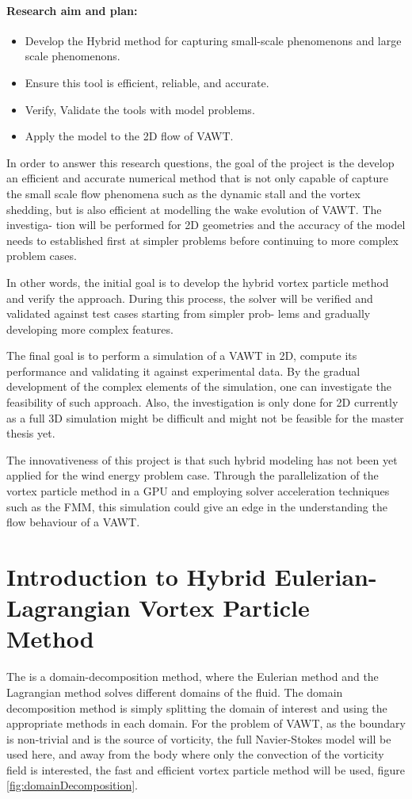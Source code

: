 \paragraph*{Research aim and plan:}
\begin{itemize}
\item Develop the Hybrid method for capturing small-scale phenomenons and large scale phenomenons.
\item Ensure this tool is efficient, reliable, and accurate.
\item Verify, Validate the tools with model problems.
\item Apply the model to the 2D flow of VAWT.
\end{itemize}

In order to answer this research questions, the goal of the project is the develop an efficient and accurate
numerical method that is not only capable of capture the small scale flow phenomena such as the dynamic
stall and the vortex shedding, but is also efficient at modelling the wake evolution of VAWT. The investiga-
tion will be performed for 2D geometries and the accuracy of the model needs to established first at simpler
problems before continuing to more complex problem cases.

In other words, the initial goal is to develop the hybrid vortex particle method and verify the approach.
During this process, the solver will be verified and validated against test cases starting from simpler prob-
lems and gradually developing more complex features.

The final goal is to perform a simulation of a VAWT in 2D, compute its performance and validating it
against experimental data. By the gradual development of the complex elements of the simulation, one can
investigate the feasibility of such approach. Also, the investigation is only done for 2D currently as a full 3D
simulation might be difficult and might not be feasible for the master thesis yet.

The innovativeness of this project is that such hybrid modeling has not been yet applied for the wind energy
problem case. Through the parallelization of the vortex particle method in a GPU and employing solver acceleration techniques such as the FMM, this simulation could give an edge in the understanding the flow behaviour of a VAWT.

\section{Introduction to Hybrid Eulerian-Lagrangian Vortex Particle Method}
The  is a domain-decomposition method, where the Eulerian method and the Lagrangian method solves different domains of the fluid. The domain decomposition method is simply splitting the domain of interest and using the appropriate methods in each domain. For the problem of VAWT, as the boundary is non-trivial and is the source of vorticity, the full Navier-Stokes model will be used here, and away from the body where only the convection of the vorticity field is interested, the fast and efficient vortex particle method will be used, figure \ref{fig:domainDecomposition}.

